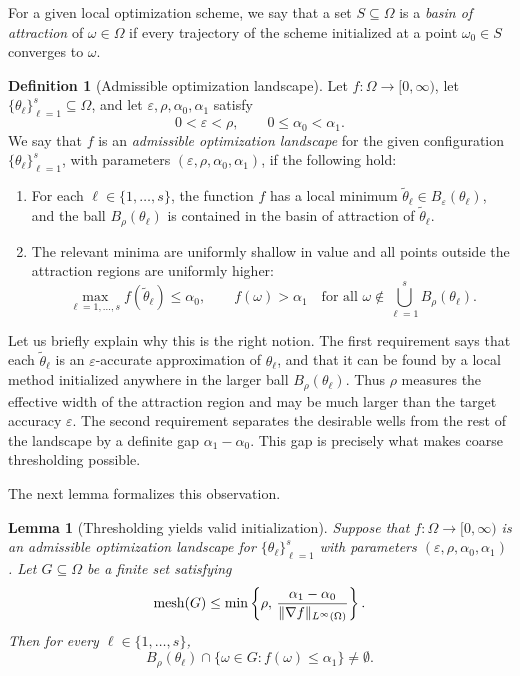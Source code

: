 \documentclass[11pt]{article}
\newtheorem{lemma}[theorem]{Lemma}
\theoremstyle{definition}
\newtheorem{definition}{Definition}[section]
\numberwithin{theorem}{section}
\numberwithin{lemma}{section}
\numberwithin{equation}{section}
\renewcommand{\subset}{\subseteq}
\renewcommand{\tilde}{\widetilde}
\renewcommand{\epsilon}{\varepsilon}
\newcommand{\mesh}{{\rm mesh}}
\newcommand{\domain}{\Omega}
\numberwithin{equation}{section}
\begin{document}
For a given local optimization scheme, we say that a set $S\subset \Omega$ is a \emph{basin of attraction} of $\omega\in\Omega$ if every trajectory of the scheme initialized at a point $\omega_0\in S$ converges to $\omega$.

\begin{definition}[Admissible optimization landscape]
\label{def:desirable}
Let $f\colon \domain\to [0,\infty)$, let $\{\theta_\ell\}_{\ell=1}^s\subset \domain$, and let $\epsilon,\rho,\alpha_0,\alpha_1$ satisfy
\[
0<\epsilon<\rho,
\qquad
0\le \alpha_0<\alpha_1.
\]
We say that $f$ is an \emph{admissible optimization landscape} for the given configuration $\{\theta_\ell\}_{\ell=1}^s$, with parameters $(\epsilon,\rho,\alpha_0,\alpha_1)$, if the following hold:
\begin{enumerate}
\item
For each $\ell\in\{1,\dots,s\}$, the function $f$ has a local minimum $\tilde\theta_\ell\in B_\epsilon(\theta_\ell)$, and the ball $B_\rho(\theta_\ell)$ is contained in the basin of attraction of $\tilde\theta_\ell$.

\item
The relevant minima are uniformly shallow in value and all points outside the attraction regions are uniformly higher:
\[
\max_{\ell=1,\dots,s} f(\tilde\theta_\ell)\le \alpha_0,
\qquad
f(\omega)>\alpha_1
\quad
\text{for all }
\omega\notin \bigcup_{\ell=1}^s B_\rho(\theta_\ell).
\]
\end{enumerate}
\end{definition}

Let us briefly explain why this is the right notion. The first requirement says that each $\tilde\theta_\ell$ is an $\epsilon$-accurate approximation of $\theta_\ell$, and that it can be found by a local method initialized anywhere in the larger ball $B_\rho(\theta_\ell)$. Thus $\rho$ measures the effective width of the attraction region and may be much larger than the target accuracy $\epsilon$. The second requirement separates the desirable wells from the rest of the landscape by a definite gap $\alpha_1-\alpha_0$. This gap is precisely what makes coarse thresholding possible.

The next lemma formalizes this observation.

\begin{lemma}[Thresholding yields valid initialization]
\label{lem:threshold}
Suppose that $f\colon \Omega\to [0,\infty)$ is an admissible optimization landscape for $\{\theta_\ell\}_{\ell=1}^s$ with parameters $(\epsilon,\rho,\alpha_0,\alpha_1)$. Let $G\subset \domain$ be a finite set satisfying
\[
\mesh(G)
\le
\min\left\{
\rho,\,
\frac{\alpha_1-\alpha_0}{\|\nabla f\|_{L^\infty(\domain)}}
\right\}.
\]
Then for every $\ell\in\{1,\dots,s\}$,
\[
B_\rho(\theta_\ell)\cap \{\omega\in G:f(\omega)\le \alpha_1\}\neq \emptyset.
\]
\end{lemma}
\end{document}
